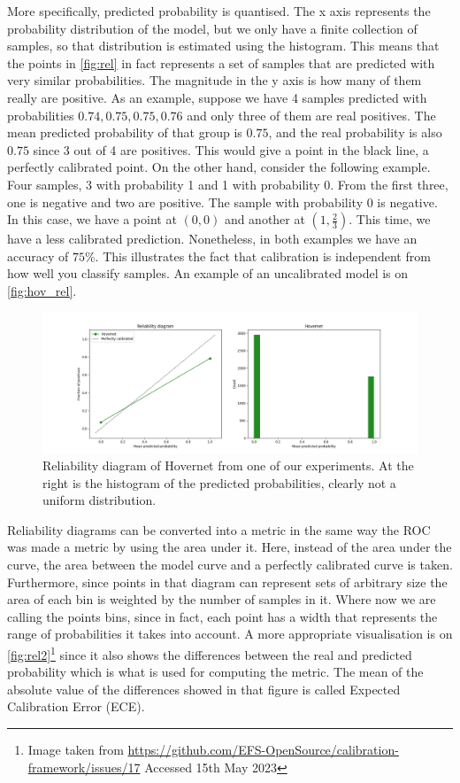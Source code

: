 More specifically, predicted probability is quantised. The x axis represents the probability distribution of the model, but we only have a finite collection of samples, so that distribution is estimated using the histogram. This means that the points in \autoref{fig:rel} in fact represents a set of samples that are predicted with very similar probabilities. The magnitude in the y axis is how many of them really are positive. As an example, suppose we have 4 samples predicted with probabilities $0.74, 0.75, 0.75, 0.76$ and only three of them are real positives. The mean predicted probability of that group is $0.75$, and the real probability is also $0.75$ since 3 out of 4 are positives. This would give a point in the black line, a perfectly calibrated point. On the other hand, consider the following example. Four samples, 3 with probability 1 and 1 with probability 0. From the first three, one is negative and two are positive. The sample with probability 0 is negative. In this case, we have a point at $(0,0)$ and another at $(1,\frac{2}{3})$. This time, we have a less calibrated prediction. Nonetheless, in both examples we have an accuracy of $75\%$. This illustrates the fact that calibration is independent from how well you classify samples. An example of an uncalibrated model is on \autoref{fig:hov_rel}.

\begin{figure}[ht]
    \centering
    \includegraphics[width=\textwidth]{imgs/hov_rel_diag.png}
    \caption{Reliability diagram of Hovernet from one of our experiments. At the right is the histogram of the predicted probabilities, clearly not a uniform distribution.}
    \label{fig:hov_rel}
\end{figure}

Reliability diagrams can be converted into a metric in the same way the ROC was made a metric by using the area under it. Here, instead of the area under the curve, the area between the model curve and a perfectly calibrated curve is taken. Furthermore, since points in that diagram can represent sets of arbitrary size the area of each bin is weighted by the number of samples in it. Where now we are calling the points bins, since in fact, each point has a width that represents the range of probabilities it takes into account. A more appropriate visualisation is on \autoref{fig:rel2}\footnote{Image taken from \url{https://github.com/EFS-OpenSource/calibration-framework/issues/17} Accessed 15th May 2023} since it also shows the differences between the real and predicted probability which is what is used for computing the metric. The mean of the absolute value of the differences showed in that figure is called Expected Calibration Error (ECE).

